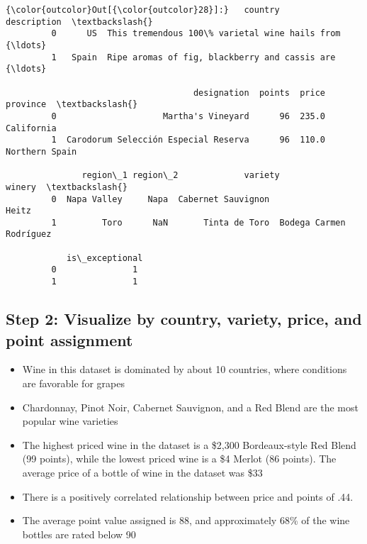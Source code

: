 \documentclass[11pt]{article}
\providecommand{\tightlist}{%
      \setlength{\itemsep}{0pt}\setlength{\parskip}{0pt}}
\begin{document}
\begin{Verbatim}[commandchars=\\\{\}]
{\color{outcolor}Out[{\color{outcolor}28}]:}   country                                        description  \textbackslash{}
         0      US  This tremendous 100\% varietal wine hails from {\ldots}   
         1   Spain  Ripe aromas of fig, blackberry and cassis are {\ldots}   
         
                                     designation  points  price        province  \textbackslash{}
         0                     Martha's Vineyard      96  235.0      California   
         1  Carodorum Selección Especial Reserva      96  110.0  Northern Spain   
         
               region\_1 region\_2             variety                   winery  \textbackslash{}
         0  Napa Valley     Napa  Cabernet Sauvignon                    Heitz   
         1         Toro      NaN       Tinta de Toro  Bodega Carmen Rodríguez   
         
            is\_exceptional  
         0               1  
         1               1  
\end{Verbatim}
            
    \subsection{Step 2: Visualize by country, variety, price, and point
assignment}\label{step-2-visualize-by-country-variety-price-and-point-assignment}

\begin{itemize}
\tightlist
\item
  Wine in this dataset is dominated by about 10 countries, where
  conditions are favorable for grapes
\item
  Chardonnay, Pinot Noir, Cabernet Sauvignon, and a Red Blend are the
  most popular wine varieties
\item
  The highest priced wine in the dataset is a \$2,300 Bordeaux-style Red
  Blend (99 points), while the lowest priced wine is a \$4 Merlot (86
  points). The average price of a bottle of wine in the dataset was \$33
\item
  There is a positively correlated relationship between price and points
  of .44.
\item
  The average point value assigned is 88, and approximately 68\% of the
  wine bottles are rated below 90
\end{itemize}
\end{document}
